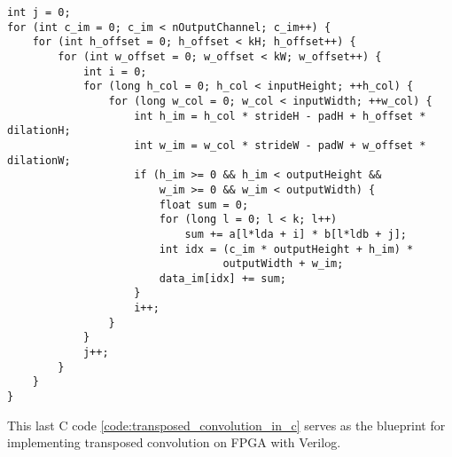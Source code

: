 \begin{code}
\begin{verbatim}
int j = 0;
for (int c_im = 0; c_im < nOutputChannel; c_im++) {
    for (int h_offset = 0; h_offset < kH; h_offset++) {
        for (int w_offset = 0; w_offset < kW; w_offset++) {
            int i = 0;
            for (long h_col = 0; h_col < inputHeight; ++h_col) {
                for (long w_col = 0; w_col < inputWidth; ++w_col) {
                    int h_im = h_col * strideH - padH + h_offset * dilationH;
                    int w_im = w_col * strideW - padW + w_offset * dilationW;
                    if (h_im >= 0 && h_im < outputHeight &&
                        w_im >= 0 && w_im < outputWidth) {
                        float sum = 0;
                        for (long l = 0; l < k; l++)
                            sum += a[l*lda + i] * b[l*ldb + j];
                        int idx = (c_im * outputHeight + h_im) *
                                  outputWidth + w_im;
                        data_im[idx] += sum;
                    }
                    i++;
                }
            }
            j++;
        }
    }
}
\end{verbatim}
\label{code:transposed_convolution_in_c}
\end{code}

This last C code \ref{code:transposed_convolution_in_c} serves as the blueprint for implementing
transposed convolution on FPGA with Verilog.
\clearpage %

